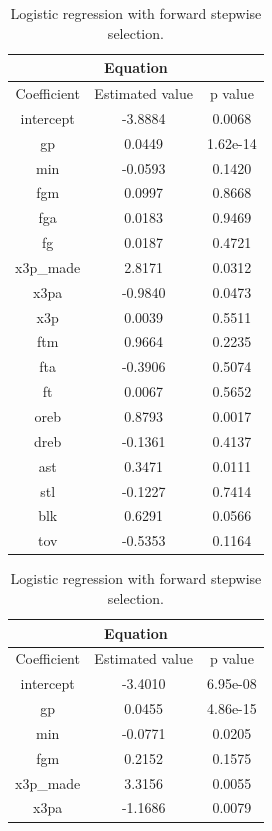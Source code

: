 \begin{table}[h]
	\begin{subtable}[h]{0.4\textwidth}
		\centering
		\begin{tabular}{||c | c | c ||} 
			\hline
			\multicolumn{3}{|c|}{Equation} \\
			\hline
			Coefficient & Estimated value & p value \\
			\hline
			intercept & -3.8884 & 0.0068 \\
			gp & 0.0449 & 1.62e-14 \\
			min & -0.0593 & 0.1420 \\
			fgm & 0.0997 & 0.8668 \\
			fga & 0.0183 & 0.9469 \\
			fg & 0.0187 & 0.4721 \\
			x3p\_made & 2.8171 & 0.0312 \\
			x3pa & -0.9840 & 0.0473 \\
			x3p & 0.0039 & 0.5511 \\
			ftm & 0.9664 & 0.2235 \\
			fta & -0.3906 & 0.5074 \\
			ft & 0.0067 & 0.5652 \\
			oreb & 0.8793 & 0.0017 \\
			dreb & -0.1361 & 0.4137 \\
			ast & 0.3471 & 0.0111 \\
			stl & -0.1227 & 0.7414 \\
			blk & 0.6291 & 0.0566 \\				
			tov & -0.5353 & 0.1164 \\		
			\hline
		\end{tabular}
		\caption{Logistic regression with forward stepwise selection.}
		\label{table:LRFSSSum}
	\end{subtable}
	\hfill
	\begin{subtable}[h]{0.4\textwidth}
		\centering
		\begin{tabular}{||c | c | c ||} 
			\hline
			\multicolumn{3}{|c|}{Equation} \\
			\hline
			Coefficient & Estimated value & p value \\
			\hline
			intercept & -3.4010 & 6.95e-08 \\
			gp & 0.0455 & 4.86e-15 \\
			min & -0.0771 & 0.0205 \\
			fgm & 0.2152 & 0.1575 \\
			x3p\_made & 3.3156 & 0.0055 \\
			x3pa & -1.1686 & 0.0079 \\

\end{tabular}
\end{subtable}
\end{table}
